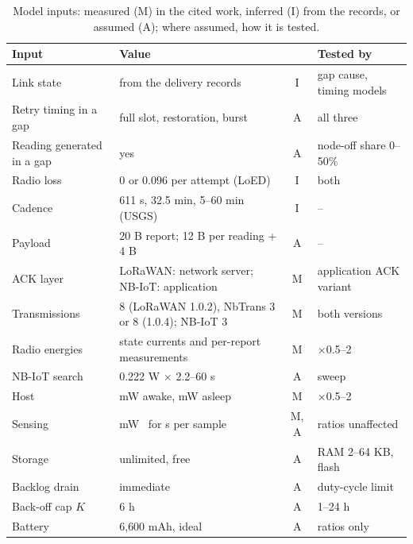 \begin{table}[t]
\centering
\caption{Model inputs: measured (M) in the cited work, inferred (I) from the records, or assumed (A); where assumed, how it is tested.}
\label{tab:assumptions}
\scriptsize
\setlength{\tabcolsep}{2pt}
\begin{tabular}{@{}p{2.4cm}p{3.6cm}cp{1.9cm}@{}}
\toprule
Input & Value & & Tested by \\
\midrule
Link state & from the delivery records & I & gap cause, timing models \\
Retry timing in a gap & full slot, restoration, burst & A & all three \\
Reading generated in a gap & yes & A & node-off share 0--50\% \\
Radio loss & 0 or 0.096 per attempt (LoED) & I & both \\
Cadence & 611 s, 32.5 min, 5--60 min (USGS) & I & -- \\
Payload & 20 B report; 12 B per reading + 4 B & A & -- \\
ACK layer & LoRaWAN: network server; NB-IoT: application & M & application ACK variant \\
Transmissions & 8 (LoRaWAN 1.0.2), NbTrans 3 or 8 (1.0.4); NB-IoT 3 & M & both versions \\
Radio energies & state currents and per-report measurements~\cite{casals2017lorawan,michelinakis2021dissecting} & M & $\times$0.5--2 \\
NB-IoT search & 0.222 W $\times$ 2.2--60 s & A & sweep \\
Host & \hostOnMW{} mW awake, \hostSleepMW{} mW asleep~\cite{libeliumwaspmote} & M & $\times$0.5--2 \\
Sensing & \hostSenseMW{} mW~\cite{libeliumsmartwater} for \tSenseS{} s per sample & M, A & ratios unaffected \\
Storage & unlimited, free & A & RAM 2--64 KB, flash \\
Backlog drain & immediate & A & duty-cycle limit \\
Back-off cap $K$ & 6 h & A & 1--24 h \\
Battery & 6{,}600 mAh, ideal & A & ratios only \\
\bottomrule
\end{tabular}
\end{table}

